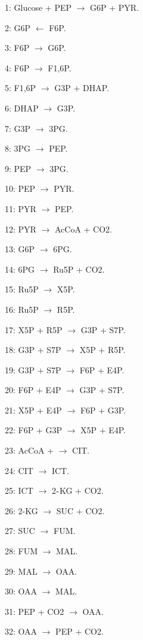 \documentclass[ amsmath,amssymb,nofootinbib
]{revtex4-1}
\begin{document}
{\small 
1: Glucose  +  PEP  $\rightarrow$  G6P  +  PYR. 
 
 2: G6P   $\leftarrow$  F6P. 
 
 3: F6P   $\rightarrow$  G6P.
  
  4: F6P  $\rightarrow$  F1,6P. 
   
   5: F1,6P  $\rightarrow$  G3P  +  DHAP. 
   
   6: DHAP   $\rightarrow$  G3P.
   
 7: G3P   $\rightarrow$  3PG. 
  
  8: 3PG   $\rightarrow$  PEP. 
  
  9: PEP   $\rightarrow$  3PG.  
  
  10: PEP   $\rightarrow$  PYR. 
  
  11: PYR   $\rightarrow$  PEP. 
  
  12: PYR    $\rightarrow$  AcCoA  +   CO2. 
  
  13: G6P  $\rightarrow$  6PG. 
  
  14: 6PG  $\rightarrow$   Ru5P  +  CO2. 
  
  15: Ru5P  $\rightarrow$  X5P.
  
   16: Ru5P  $\rightarrow$   R5P. 
   
   17: X5P  +  R5P  $\rightarrow$   G3P  +  S7P. 
   
   18: G3P  +  S7P  $\rightarrow$   X5P  +  R5P. 
   
   19: G3P  +  S7P  $\rightarrow$   F6P  +  E4P.
   
    20: F6P  +  E4P  $\rightarrow$  G3P  +  S7P. 
    
21:  X5P  +  E4P  $\rightarrow$   F6P  +  G3P. 
  
  22: F6P   +  G3P  $\rightarrow$   X5P  +  E4P.  
  
  23: AcCoA  +    $\rightarrow$  CIT. 
  
  24: CIT   $\rightarrow$  ICT. 
  
  25: ICT  $\rightarrow$  2${\rm \mathchar`-}$KG  +  CO2. 
  
  26: 2-KG  $\rightarrow$   SUC  +  CO2.
  
   27: SUC   $\rightarrow$  FUM. 
   
  28:  FUM  $\rightarrow$  MAL. 
   
   29: MAL   $\rightarrow$  OAA.
   
 30: OAA   $\rightarrow$  MAL.

 31: PEP  +  CO2  $\rightarrow$  OAA.

 32: OAA  $\rightarrow$  PEP  +   CO2. 

}
\end{document}
